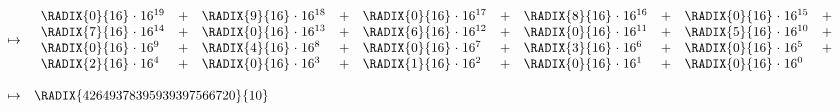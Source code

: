 \begin{itemize}
\[\begin{array}{lcl}
              &\mapsto& \begin{array}{*{5}{l@{\;}c@{\;}lc}}
                        \RADIX{0}{16} &\cdot& 16^{19} &+&
                        \RADIX{9}{16} &\cdot& 16^{18} &+&
                        \RADIX{0}{16} &\cdot& 16^{17} &+&
                        \RADIX{8}{16} &\cdot& 16^{16} &+&
                        \RADIX{0}{16} &\cdot& 16^{15} &+\\
                        \RADIX{7}{16} &\cdot& 16^{14} &+&
                        \RADIX{0}{16} &\cdot& 16^{13} &+&
                        \RADIX{6}{16} &\cdot& 16^{12} &+&
                        \RADIX{0}{16} &\cdot& 16^{11} &+&
                        \RADIX{5}{16} &\cdot& 16^{10} &+\\
                        \RADIX{0}{16} &\cdot& 16^{ 9} &+&
                        \RADIX{4}{16} &\cdot& 16^{ 8} &+&
                        \RADIX{0}{16} &\cdot& 16^{ 7} &+&
                        \RADIX{3}{16} &\cdot& 16^{ 6} &+&
                        \RADIX{0}{16} &\cdot& 16^{ 5} &+\\
                        \RADIX{2}{16} &\cdot& 16^{ 4} &+&
                        \RADIX{0}{16} &\cdot& 16^{ 3} &+&
                        \RADIX{1}{16} &\cdot& 16^{ 2} &+&
                        \RADIX{0}{16} &\cdot& 16^{ 1} &+&
                        \RADIX{0}{16} &\cdot& 16^{ 0} & \\
                        \end{array}                     \\\\
              &\mapsto& \RADIX{42649378395939397566720}{10}
      \end{array}
      \]
\end{itemize}

